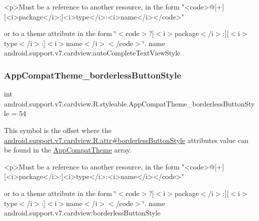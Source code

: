 \begin{DoxyVerb}      <p>Must be a reference to another resource, in the form "<code>@[+][<i>package</i>:]<i>type</i>:<i>name</i></code>"
\end{DoxyVerb}
 or to a theme attribute in the form \char`\"{}$<$code$>$?\mbox{[}$<$i$>$package$<$/i$>$\+:\mbox{]}\mbox{[}$<$i$>$type$<$/i$>$\+:\mbox{]}$<$i$>$name$<$/i$>$$<$/code$>$\char`\"{}.  name android.\+support.\+v7.\+cardview\+:auto\+Complete\+Text\+View\+Style \mbox{\label{classandroid_1_1support_1_1v7_1_1cardview_1_1R_1_1styleable_ac59aefe71e126f596474d5fa2287b1ce}} 
\subsubsection{\texorpdfstring{App\+Compat\+Theme\+\_\+borderless\+Button\+Style}{AppCompatTheme\_borderlessButtonStyle}}
{\footnotesize\ttfamily int android.\+support.\+v7.\+cardview.\+R.\+styleable.\+App\+Compat\+Theme\+\_\+borderless\+Button\+Style = 54\hspace{0.3cm}{\ttfamily [static]}}

This symbol is the offset where the \hyperlink{classandroid_1_1support_1_1v7_1_1cardview_1_1R_1_1attr_a497f728b369f40e88879fcf873233148}{android.\+support.\+v7.\+cardview.\+R.\+attr\#borderless\+Button\+Style} attribute\textquotesingle{}s value can be found in the \hyperlink{classandroid_1_1support_1_1v7_1_1cardview_1_1R_1_1styleable_a52e6f69f954ecc2622d72c0b4d298938}{App\+Compat\+Theme} array.

\begin{DoxyVerb}      <p>Must be a reference to another resource, in the form "<code>@[+][<i>package</i>:]<i>type</i>:<i>name</i></code>"
\end{DoxyVerb}
 or to a theme attribute in the form \char`\"{}$<$code$>$?\mbox{[}$<$i$>$package$<$/i$>$\+:\mbox{]}\mbox{[}$<$i$>$type$<$/i$>$\+:\mbox{]}$<$i$>$name$<$/i$>$$<$/code$>$\char`\"{}.  name android.\+support.\+v7.\+cardview\+:borderless\+Button\+Style \mbox{\label{classandroid_1_1support_1_1v7_1_1cardview_1_1R_1_1styleable_afd2644581cb07d6cd4ed27a053bf6525}} 
